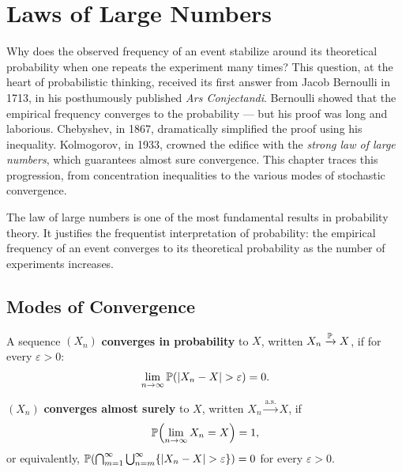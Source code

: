 \chapter{Laws of Large Numbers}
\label{ch:lln}

Why does the observed frequency of an event stabilize around its theoretical probability when one repeats the experiment many times? This question, at the heart of probabilistic thinking, received its first answer from Jacob Bernoulli in 1713, in his posthumously published \emph{Ars Conjectandi}. Bernoulli showed that the empirical frequency converges to the probability --- but his proof was long and laborious. Chebyshev, in 1867, dramatically simplified the proof using his inequality. Kolmogorov, in 1933, crowned the edifice with the \emph{strong law of large numbers}, which guarantees almost sure convergence. This chapter traces this progression, from concentration inequalities to the various modes of stochastic convergence.

\begin{intuition}
The law of large numbers is one of the most fundamental results in probability
theory. It justifies the frequentist interpretation of probability: the empirical
frequency of an event converges to its theoretical probability as the number of
experiments increases.
\end{intuition}

\section{Modes of Convergence}

\begin{definition}
A sequence $(X_n)$ \textbf{converges in probability} to $X$, written
$X_n \xrightarrow{\mathbb{P}} X$, if for every $\varepsilon > 0$:
\[
    \lim_{n \to \infty} \mathbb{P}(\left| X_n - X \right| > \varepsilon) = 0.
\]
\end{definition}

\begin{definition}
$(X_n)$ \textbf{converges almost surely} to $X$, written
$X_n \xrightarrow{\text{a.s.}} X$, if
\[
    \mathbb{P}\!\left(\lim_{n \to \infty} X_n = X\right) = 1,
\]
or equivalently, $\mathbb{P}\!\left(\bigcap_{m=1}^{\infty}
\bigcup_{n=m}^{\infty}\{\left| X_n - X \right| > \varepsilon\}\right) = 0$
for every $\varepsilon > 0$.
\end{definition}

